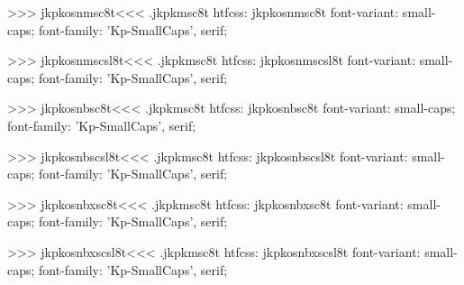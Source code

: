 >>>
\<jkpkosnmsc8t\><<<
.jkpkmsc8t
htfcss:  jkpkosnmsc8t  font-variant: small-caps; font-family: 'Kp-SmallCaps', serif;

>>>
\<jkpkosnmscsl8t\><<<
.jkpkmsc8t
htfcss:  jkpkosnmscsl8t  font-variant: small-caps; font-family: 'Kp-SmallCaps', serif;

>>>
\<jkpkosnbsc8t\><<<
.jkpkmsc8t
htfcss:  jkpkosnbsc8t  font-variant: small-caps; font-family: 'Kp-SmallCaps', serif;

>>>
\<jkpkosnbscsl8t\><<<
.jkpkmsc8t
htfcss:  jkpkosnbscsl8t  font-variant: small-caps; font-family: 'Kp-SmallCaps', serif;

>>>
\<jkpkosnbxsc8t\><<<
.jkpkmsc8t
htfcss:  jkpkosnbxsc8t  font-variant: small-caps; font-family: 'Kp-SmallCaps', serif;

>>>
\<jkpkosnbxscsl8t\><<<
.jkpkmsc8t
htfcss:  jkpkosnbxscsl8t  font-variant: small-caps; font-family: 'Kp-SmallCaps', serif;

